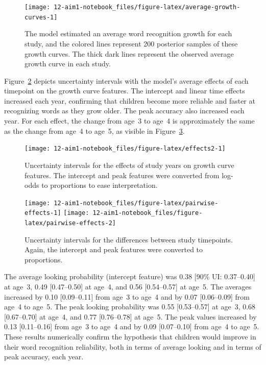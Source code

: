 \documentclass [11pt, proquest] {uwthesis}[2015/03/03]
\begin{document}
\begin{figure}
\texttt{[image: 12-aim1-notebook\_files/figure-latex/average-growth-curves-1]} \caption{The model estimated an average word
recognition growth for each study, and the colored lines represent 200
posterior samples of these growth curves. The thick dark lines represent
the observed average growth curve in each study.}\label{fig:average-growth-curves}
\end{figure}
Figure~\ref{fig:effects2} depicts uncertainty intervals with the model's
average effects of each timepoint on the growth curve features. The
intercept and linear time effects increased each year, confirming that
children become more reliable and faster at recognizing words as they
grow older. The peak accuracy also increased each year. For each effect,
the change from age~3 to age~4 is approximately the same as the change
from age~4 to age~5, as visible in Figure~\ref{fig:pairwise-effects}.




\begin{figure}
\texttt{[image: 12-aim1-notebook\_files/figure-latex/effects2-1]} \caption{Uncertainty intervals for the effects of study years on
growth curve features. The intercept and peak features were converted
from log-odds to proportions to ease interpretation.}\label{fig:effects2}
\end{figure}



\begin{figure}
\texttt{[image: 12-aim1-notebook\_files/figure-latex/pairwise-effects-1]} \texttt{[image: 12-aim1-notebook\_files/figure-latex/pairwise-effects-2]} \caption{Uncertainty intervals for the differences between
study timepoints. Again, the intercept and peak features were converted
to proportions.}\label{fig:pairwise-effects}
\end{figure}
The average looking probability (intercept feature) was 0.38 {[}90\% UI:
0.37--0.40{]} at age~3, 0.49 {[}0.47--0.50{]} at age~4, and 0.56
{[}0.54--0.57{]} at age~5. The averages increased by 0.10
{[}0.09--0.11{]} from age~3 to age~4 and by 0.07 {[}0.06--0.09{]} from
age~4 to age~5. The peak looking probability was 0.55 {[}0.53--0.57{]}
at age~3, 0.68 {[}0.67--0.70{]} at age~4, and 0.77 {[}0.76--0.78{]} at
age~5. The peak values increased by 0.13 {[}0.11--0.16{]} from age~3 to
age~4 and by 0.09 {[}0.07--0.10{]} from age~4 to age~5. These results
numerically confirm the hypothesis that children would improve in their
word recognition reliability, both in terms of average looking and in
terms of peak accuracy, each year.
\end{document}
